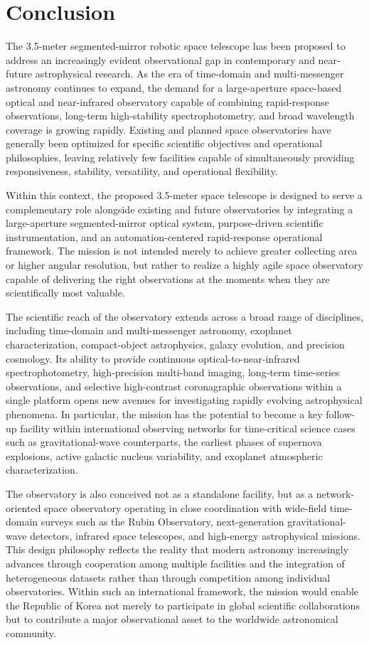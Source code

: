 \chapter{Conclusion}

The 3.5-meter segmented-mirror robotic space telescope has been proposed to address an increasingly evident observational gap in contemporary and near-future astrophysical research. As the era of time-domain and multi-messenger astronomy continues to expand, the demand for a large-aperture space-based optical and near-infrared observatory capable of combining rapid-response observations, long-term high-stability spectrophotometry, and broad wavelength coverage is growing rapidly. Existing and planned space observatories have generally been optimized for specific scientific objectives and operational philosophies, leaving relatively few facilities capable of simultaneously providing responsiveness, stability, versatility, and operational flexibility.

Within this context, the proposed 3.5-meter space telescope is designed to serve a complementary role alongside existing and future observatories by integrating a large-aperture segmented-mirror optical system, purpose-driven scientific instrumentation, and an automation-centered rapid-response operational framework. The mission is not intended merely to achieve greater collecting area or higher angular resolution, but rather to realize a highly agile space observatory capable of delivering the right observations at the moments when they are scientifically most valuable.

The scientific reach of the observatory extends across a broad range of disciplines, including time-domain and multi-messenger astronomy, exoplanet characterization, compact-object astrophysics, galaxy evolution, and precision cosmology. Its ability to provide continuous optical-to-near-infrared spectrophotometry, high-precision multi-band imaging, long-term time-series observations, and selective high-contrast coronagraphic observations within a single platform opens new avenues for investigating rapidly evolving astrophysical phenomena. In particular, the mission has the potential to become a key follow-up facility within international observing networks for time-critical science cases such as gravitational-wave counterparts, the earliest phases of supernova explosions, active galactic nucleus variability, and exoplanet atmospheric characterization.

The observatory is also conceived not as a standalone facility, but as a network-oriented space observatory operating in close coordination with wide-field time-domain surveys such as the Rubin Observatory, next-generation gravitational-wave detectors, infrared space telescopes, and high-energy astrophysical missions. This design philosophy reflects the reality that modern astronomy increasingly advances through cooperation among multiple facilities and the integration of heterogeneous datasets rather than through competition among individual observatories. Within such an international framework, the mission would enable the Republic of Korea not merely to participate in global scientific collaborations but to contribute a major observational asset to the worldwide astronomical community.

